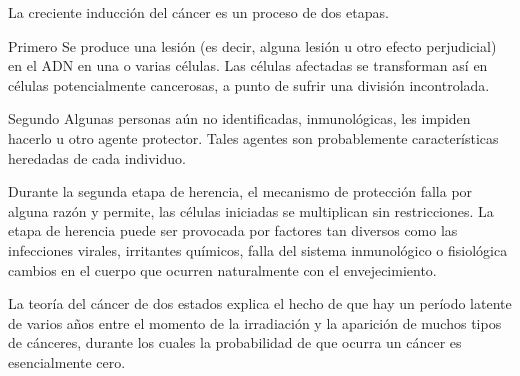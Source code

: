 \documentclass{beamer}
\begin{document}
   
\begin{frame}
	   
	   \begin{block}{}
	   La creciente inducción del cáncer es un proceso de dos etapas.\\
	   \end{block}
	   
	   \begin{block}{Primero}
	     Se produce una lesión (es decir, alguna lesión u otro efecto perjudicial) en el ADN en una o varias células. Las células afectadas se transforman así en células potencialmente cancerosas, a punto de sufrir una división incontrolada. 
	   \end{block}
	   
	   \begin{block}{Segundo}
	   	Algunas personas aún no identificadas, inmunológicas, les impiden hacerlo u otro agente protector. Tales agentes son probablemente características heredadas de cada individuo.\\	
	   \end{block}
	    
\end{frame}


\begin{frame}
	Durante la segunda etapa de herencia, el mecanismo de protección falla por alguna razón y permite, las células iniciadas se multiplican sin restricciones. La etapa de herencia puede ser provocada por factores tan diversos como las infecciones virales, irritantes químicos, falla del sistema inmunológico o fisiológica cambios en el cuerpo que ocurren naturalmente con el envejecimiento.\\
	
	\begin{block}{}
		La teoría del cáncer de dos estados explica el hecho de que hay un período latente de varios años entre el momento de la irradiación y la aparición de muchos tipos de cánceres, durante los cuales la probabilidad de que ocurra un cáncer es esencialmente cero.\\
	\end{block}

\end{frame}

\end{document}
